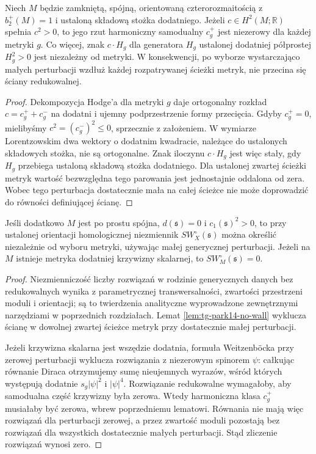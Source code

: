 \begin{lemat}
\label{lem:tg-park14-no-wall}
Niech $M$ będzie zamkniętą, spójną, orientowaną
czterorozmaitością z $b_2^+(M)=1$ i ustaloną składową
stożka dodatniego. Jeżeli $c\in H^2(M;\mathbb R)$
spełnia $c^2>0$, to jego rzut harmoniczny samodualny
$c_g^+$ jest niezerowy dla każdej metryki $g$.
Co więcej, znak $c\cdot H_g$ dla generatora $H_g$
ustalonej dodatniej półprostej $H_g^2>0$ jest niezależny
od metryki. W konsekwencji, po wyborze wystarczająco małych
perturbacji wzdłuż każdej rozpatrywanej ścieżki metryk,
nie przecina się ściany redukowalnej.
\end{lemat}

\begin{proof}
Dekompozycja Hodge'a dla metryki $g$ daje ortogonalny
rozkład $c=c_g^++c_g^-$ na dodatni i ujemny podprzestrzenie
formy przecięcia. Gdyby $c_g^+=0$, mielibyśmy
$c^2=(c_g^-)^2\le0$, sprzecznie z założeniem.
W wymiarze Lorentzowskim dwa wektory o dodatnim kwadracie,
należące do ustalonych składowych stożka, nie są ortogonalne.
Znak iloczynu $c\cdot H_g$ jest więc stały, gdy $H_g$
przebiega ustaloną składową stożka dodatniego.
Dla ustalonej zwartej ścieżki metryk wartość bezwzględna
tego parowania jest jednostajnie oddalona od zera.
Wobec tego perturbacja dostatecznie mała na całej ścieżce
nie może doprowadzić do równości definiującej ścianę.
\end{proof}

\begin{wniosek}
\label{cor:tg-park14-small-invariant}
Jeśli dodatkowo $M$ jest po prostu spójna, $d(\mathfrak s)=0$
i $c_1(\mathfrak s)^2>0$, to przy ustalonej orientacji
homologicznej niezmiennik $SW_X^{\circ}(\mathfrak s)$
można określić niezależnie od wyboru metryki, używając
małej generycznej perturbacji. Jeżeli na $M$ istnieje
metryka dodatniej krzywizny skalarnej, to
$SW_M^{\circ}(\mathfrak s)=0$.
\end{wniosek}

\begin{proof}
Niezmienniczość liczby rozwiązań w rodzinie generycznych
danych bez redukowalnych wynika z parametrycznej
transwersalności, zwartości przestrzeni moduli i orientacji;
są to twierdzenia analityczne wyprowadzone zewnętrznymi
narzędziami w poprzednich rozdziałach. Lemat
\ref{lem:tg-park14-no-wall} wyklucza ścianę w dowolnej
zwartej ścieżce metryk przy dostatecznie małej perturbacji.

Jeżeli krzywizna skalarna jest wszędzie dodatnia, formuła
Weitzenböcka przy zerowej perturbacji wyklucza rozwiązania
z niezerowym spinorem $\psi$: całkując równanie Diraca
otrzymujemy sumę nieujemnych wyrazów, wśród których
występują dodatnie $s_g|\psi|^2$ i $|\psi|^4$.
Rozwiązanie redukowalne wymagałoby, aby samodualna
część krzywizny była zerowa. Wtedy harmoniczna klasa
$c_g^+$ musiałaby być zerowa, wbrew poprzedniemu lematowi.
Równania nie mają więc rozwiązań dla perturbacji zerowej,
a przez zwartość moduli pozostają bez rozwiązań dla
wszystkich dostatecznie małych perturbacji.
Stąd zliczenie rozwiązań wynosi zero.
\end{proof}

